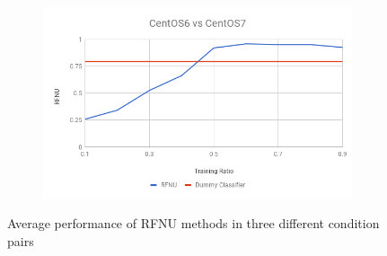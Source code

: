 \documentclass[10pt, conference, compsocconf]{IEEEtran}
\begin{document}
\begin{figure}[h!]
\begin{subfigure}[b]{0.8\linewidth}
        \end{subfigure}
        \begin{subfigure}[b]{0.8\linewidth}
                \includegraphics[width=\columnwidth]{figures/ALS/RFNU-ALS-6vs7-PFS}
        \end{subfigure}
        \caption{Average performance of RFNU methods in three different condition pairs}
        \label{fig:RFNU method}
\end{figure}
\end{document}
